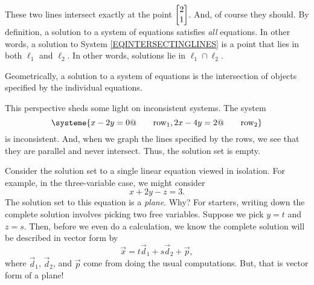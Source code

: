	\begin{center}
	\end{center}

	These two lines intersect exactly at the point $\mat{2\\1}$. And, of course they should.
	By definition, a solution to a system of equations satisfies \emph{all} equations. In other words,
	a solution to System \eqref{EQINTERSECTINGLINES} is a point that lies in both $\ell_1$ and $\ell_2$.
	In other words, solutions lie in $\ell_1\cap \ell_2$.

	\begin{emphbox}[Takeaway]
		Geometrically, a solution to a system of equations is the intersection of objects specified
		by the individual equations.
	\end{emphbox}

	This perspective sheds some light on inconsistent systems. The system
	\[
		\systeme{
			x-2y=0@\qquad\text{row}_1,
			2x-4y=2@\qquad\text{row}_2
		}
	\]
	is inconsistent. And, when we graph the lines specified by the rows, we see that they are parallel 
	and never intersect. Thus, the solution set is empty.


	Consider the solution set to a single linear equation viewed in isolation. For example,
	in the three-variable case, we might consider
	\[
		x+2y-z=3.
	\]
	The solution set to this equation is a \emph{plane}. Why? For starters, writing down the complete
	solution involves picking two free variables. Suppose we pick $y=t$ and $z=s$. Then, before we
	even do a calculation, we know the complete solution will be described in vector form by
	\[
		\vec x=t\vec d_1+s\vec d_2+\vec p,
	\]
	where $\vec d_1$, $\vec d_2$, and $\vec p$ come from doing the usual computations. But, that is vector form
	of a plane!

